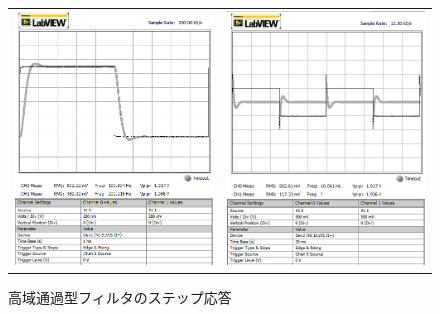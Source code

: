 \documentclass[10pt,a4j,dvipdfmx]{jsarticle}
\begin{document}
\begin{figure}[H]
    \begin{tabular}{cc}
      \begin{minipage}[t]{0.5\hsize}
        \centering
        \includegraphics[width=7cm]{LPF_step.png}
        \caption{低域通過型フィルタのステップ応答}
      \end{minipage} &
      \begin{minipage}[t]{0.5\hsize}
        \centering
        \includegraphics[width=7cm]{HPF_step.png}
        \caption{高域通過型フィルタのステップ応答}
      \end{minipage}
    \end{tabular}
  \end{figure}
\end{document}
